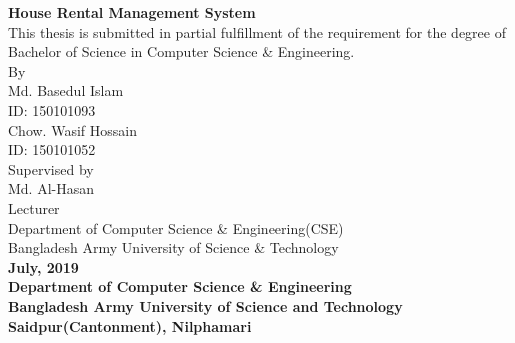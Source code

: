 \documentclass[12pt,a4paper]{article}
\begin{document}
\begin{titlepage}
	\center
	{\fontsize{14}{10}\selectfont\textbf{House Rental Management System}}\\
	\vspace{.8in}
	{\fontsize{12}{10}\selectfont This thesis is submitted in partial fulfillment of the requirement for the degree of Bachelor of Science in Computer Science \& Engineering.}\\
	\vspace{.8in}
	{\fontsize{12}{10}\selectfont By}\\
	{\fontsize{14}{10}\selectfont Md. Basedul Islam}\\
	{\fontsize{12}{10}\selectfont ID: 150101093}\\{\fontsize{14}{10}\selectfont Chow. Wasif Hossain}\\
	{\fontsize{12}{10}\selectfont ID: 150101052}\\
	\vspace{.8in}
	{\fontsize{12}{16}\selectfont Supervised by\\Md. Al-Hasan\\Lecturer\\Department of Computer Science \& Engineering(CSE)\\Bangladesh Army University of Science \& Technology}\\
	\vspace{1.2in}
	{\fontsize{12}{10}\selectfont \textbf{July, 2019}}\\
	\vspace{.5em}
	{\fontsize{16}{10}\selectfont \textbf{Department of Computer Science \& Engineering}}\\
	\vspace{.5em}
	{\fontsize{14}{10}\selectfont \textbf{Bangladesh Army University of Science and Technology}}\\
	\vspace{.5em}
	{\fontsize{12}{10}\selectfont \textbf{Saidpur(Cantonment), Nilphamari}}
\end{titlepage}
\end{document}
